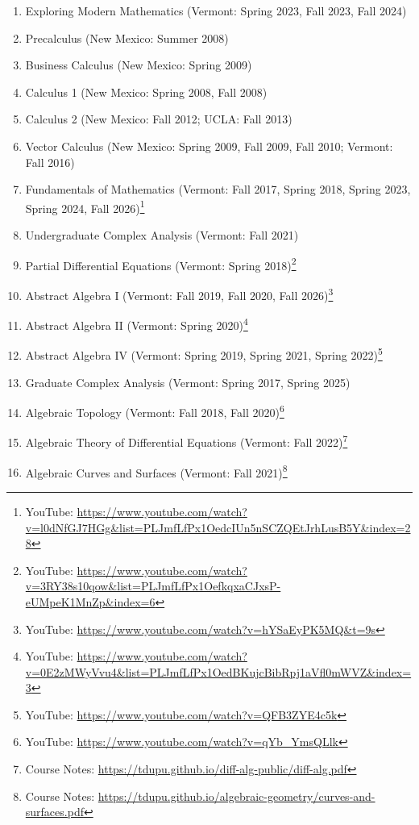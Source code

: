 \documentclass[a4paper,10pt]{article}
\begin{document}
\begin{enumerate}
	\item Exploring Modern Mathematics (Vermont: Spring 2023, Fall 2023, Fall 2024)
	\item Precalculus (New Mexico: Summer 2008)
	\item Business Calculus (New Mexico: Spring 2009)
	\item Calculus 1 (New Mexico: Spring 2008, Fall 2008)
	\item Calculus 2 (New Mexico: Fall 2012; UCLA: Fall 2013)
	\item Vector Calculus (New Mexico: Spring 2009, Fall 2009, Fall 2010;  Vermont: Fall 2016)
	\item Fundamentals of Mathematics (Vermont: Fall 2017, Spring 2018, Spring 2023, Spring 2024, Fall 2026)\footnote{
		YouTube: \url{https://www.youtube.com/watch?v=l0dNfGJ7HGg&list=PLJmfLfPx1OedcIUn5nSCZQEtJrhLusB5Y&index=28}
	}
	\item Undergraduate Complex Analysis (Vermont: Fall 2021)
	\item Partial Differential Equations (Vermont: Spring 2018)\footnote{YouTube: \url{https://www.youtube.com/watch?v=3RY38s10qow&list=PLJmfLfPx1OefkqxaCJxsP-eUMpeK1MnZp&index=6}}
	\item Abstract Algebra I (Vermont: Fall 2019, Fall 2020, Fall 2026)\footnote{YouTube: \url{https://www.youtube.com/watch?v=hYSaEyPK5MQ&t=9s}}
	\item Abstract Algebra II (Vermont: Spring 2020)\footnote{YouTube: \url{https://www.youtube.com/watch?v=0E2zMWyVvu4&list=PLJmfLfPx1OedBKujcBibRpj1aVfl0mWVZ&index=3}}
	\item Abstract Algebra IV (Vermont: Spring 2019, Spring 2021, Spring 2022)\footnote{YouTube: \url{https://www.youtube.com/watch?v=QFB3ZYE4c5k}}
	\item Graduate Complex Analysis (Vermont: Spring 2017, Spring 2025)
	\item Algebraic Topology (Vermont: Fall 2018, Fall 2020)\footnote{YouTube: \url{https://www.youtube.com/watch?v=qYb_YmsQLlk}}
	\item Algebraic Theory of Differential Equations (Vermont: Fall 2022)\footnote{Course Notes: \url{https://tdupu.github.io/diff-alg-public/diff-alg.pdf}}
	\item Algebraic Curves and Surfaces (Vermont: Fall 2021)\footnote{Course Notes: \url{https://tdupu.github.io/algebraic-geometry/curves-and-surfaces.pdf}} 
\end{enumerate}
\end{document}
